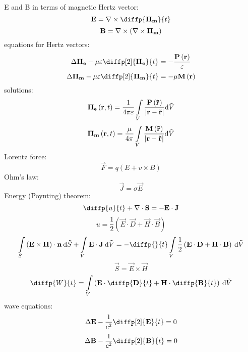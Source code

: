 E and B in terms of magnetic Hertz vector:
\begin{equation}
\vec{E} = \rot{\diffp{\vec{\Pi_m}}{t}}
\end{equation}
\begin{equation}
\mathbf{B} = \nabla \times \left(\nabla \times \mathbf{\Pi_m}\right)
\end{equation}
equations for Hertz vectors:
\begin{equation}
\laplace{\vec{\Pi_e}} - \mu \varepsilon \diffp[2]{\vec{\Pi_e}}{t} = -\frac{\vec{P}\left(\vec{r} \right)}{\varepsilon}
\end{equation}
\begin{equation}
\laplace{\vec{\Pi_m}} - \mu \varepsilon \diffp[2]{\vec{\Pi_m}}{t} = -\mu \vec{M}\left(\vec{r} \right)
\end{equation}
solutions:
\begin{equation}
\mathbf{\Pi_e}\left(\mathbf{r}, t \right) = \frac{1}{4 \pi \varepsilon} \int\limits_{V} \frac{\mathbf{P}\left(\mathbf{\tilde{r}} \right)}{\lvert\mathbf{r} - \mathbf{\tilde{r}}\rvert} \mathrm{d} \tilde{V}
\end{equation}
\begin{equation}
\mathbf{\Pi_m}\left(\mathbf{r}, t \right) = \frac{\mu}{4 \pi} \int\limits_{V} \frac{\mathbf{M}\left(\mathbf{\tilde{r}} \right)}{\lvert\mathbf{r} - \mathbf{\tilde{r}}\rvert} \mathrm{d} \tilde{V}
\end{equation}
Lorentz force:
\begin{equation}
\vec{F} = q \left(E + v \times B \right) 
\end{equation}
Ohm's law:
\begin{equation}
\vec{J} = \sigma \vec{E}
\end{equation}
Energy (Poynting) theorem:
\begin{equation}
\diffp{u}{t} + \div{\vec{S}} = - \vec{E} \cdot \vec{J}
\end{equation}
\begin{equation}
u = \frac{1}{2} \left(\vec{E} \cdot \vec{D} + \vec{H} \cdot \vec{B} \right)
\end{equation}
\begin{equation}
\int\limits_{S} \left(\vec{E} \times \vec{H} \right) \cdot \vec{n} \: \d \tilde{S} + \int\limits_{V} \vec{E} \cdot \vec{J} \: \d \tilde{V} = - \diffp{}{t} \int\limits_{V} \frac{1}{2} \left(\vec{E} \cdot \vec{D} + \vec{H} \cdot \vec{B} \right) \: \d \tilde{V}
\end{equation}
\begin{equation}
\vec{S} = \vec{E} \times \vec{H}
\end{equation}
\begin{equation}
\diffp{W}{t} = \int\limits_{V} \left(\vec{E} \cdot \diffp{\vec{D}}{t} + \vec{H} \cdot \diffp{\vec{B}}{t}\right) \: \d \tilde{V}
\end{equation}
wave equations:
\begin{equation}
\laplace{\vec{E}} - \frac{1}{c^{2}} \diffp[2]{\vec{E}}{t} = 0
\end{equation}
\begin{equation}
\laplace{\vec{B}} - \frac{1}{c^{2}} \diffp[2]{\vec{B}}{t} = 0
\end{equation}

